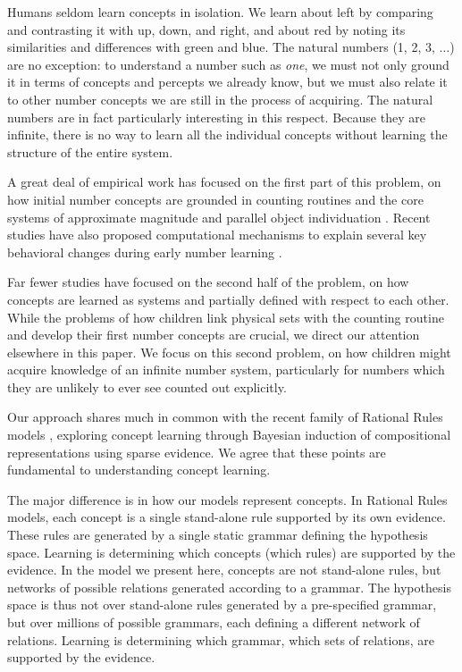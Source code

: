 \documentclass[10pt,letterpaper]{article}
\begin{document}
Humans seldom learn concepts in isolation. We learn about left by
comparing and contrasting it with up, down, and right, and about red
by noting its similarities and differences with green and blue. The
natural numbers (1, 2, 3, $\ldots$) are no exception: to understand a
number such as \emph{one}, we must not only ground it in terms of
concepts and percepts we already know, but we must also relate it to
other number concepts we are still in the process of acquiring. The
natural numbers are in fact particularly interesting in this respect.
Because they are infinite, there is no way to learn all the individual
concepts without learning the structure of the entire system.

A great deal of empirical work has focused on the first part of this
problem, on how initial number concepts are grounded in counting
routines and the core systems of approximate magnitude and parallel
object individuation \citep{dehaene2011number,feigenson2004core}.
Recent studies have also proposed computational mechanisms to explain
several key behavioral changes during early number learning
\citep{PianGoodTen2012}.

Far fewer studies have focused on the second half of the problem, on
how concepts are learned as systems and partially defined with respect
to each other. While the problems of how children link physical sets
with the counting routine and develop their first number concepts are
crucial, we direct our attention elsewhere in this paper. We focus on
this second problem, on how children might acquire knowledge of an
infinite number system, particularly for numbers which they are
unlikely to ever see counted out explicitly.

Our approach shares much in common with the recent family of Rational
Rules models
\citep{goodman2008rational,T.D.Ullman:2012:1b1b6,PianGoodTen2012},
exploring concept learning through Bayesian induction of compositional
representations using sparse evidence. We agree that these points are
fundamental to understanding concept learning.

The major difference is in how our models represent concepts. In
Rational Rules models, each concept is a single stand-alone rule
supported by its own evidence. These rules are generated by a single
static grammar defining the hypothesis space. Learning is determining
which concepts (which rules) are supported by the evidence. In the
model we present here, concepts are not stand-alone rules, but
networks of possible relations generated according to a grammar. The
hypothesis space is thus not over stand-alone rules generated by a
pre-specified grammar, but over millions of possible grammars, each
defining a different network of relations. Learning is determining
which grammar, which sets of relations, are supported by the evidence.
\end{document}
